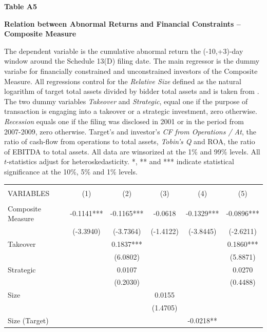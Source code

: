 \documentclass[12pt]{article}
\begin{document}
\begin{appendices}
\begin{table}[!htbp]
	\centering
	\textbf{Table A5}\par\medskip
	\large\textbf{Relation between Abnormal Returns and Financial Constraints -- Composite Measure}\par\medskip
	\justifying
	\footnotesize\noindent{} The dependent variable is the cumulative abnormal return the (-10,+3)-day window around the Schedule 13(D) filing date. The main regressor is the dummy variabe for financially constrained and unconstrained investors of the Composite Measure. All regressions control for the \emph{Relative Size} defined as the natural logarithm of target total assets divided by bidder total assets and is taken from \citet[p.112]{Khatami2014}. The two dummy variables \emph{Takeover} and \emph{Strategic}, equal one if the purpose of transaction is engaging into a takeover or a strategic investment, zero otherwise. \emph{Recession} equals one if the filing was disclosed in 2001 or in the period from 2007-2009, zero otherwise. Target's and investor's \emph{CF from Operations / At}, the ratio of cash-flow from operations to total assets, \emph{Tobin's Q} and ROA, the ratio of EBITDA to total assets. All data are winsorized at the 1\% and 99\% levels. All $t$-statistics adjust for heteroskedasticity. *, ** and *** indicate statistical significance at the 10\%, 5\% and 1\% levels.\par\medskip
	\begin{adjustbox}{max width=\textwidth}
		\begin{tabular}{lccccc} \hline
			\\
		   VARIABLES & (1) & (2) & (3) & (4) & (5) \\ \hline
			&  &  &  &  &  \\
		   Composite Measure & -0.1141*** & -0.1165*** & -0.0618 & -0.1329*** & -0.0896*** \\
			& (-3.3940) & (-3.7364) & (-1.4122) & (-3.8445) & (-2.6211) \\
		   Takeover &  & 0.1837*** &  &  & 0.1860*** \\
			&  & (6.0802) &  &  & (5.8871) \\
		   Strategic &  & 0.0107 &  &  & 0.0270 \\
			&  & (0.2030) &  &  & (0.4488) \\
		   Size &  &  & 0.0155 &  &  \\
			&  &  & (1.4705) &  &  \\
		   Size (Target) &  &  &  & -0.0218** &  \\

\end{tabular}
\end{adjustbox}
\end{table}
\end{appendices}
\end{document}
